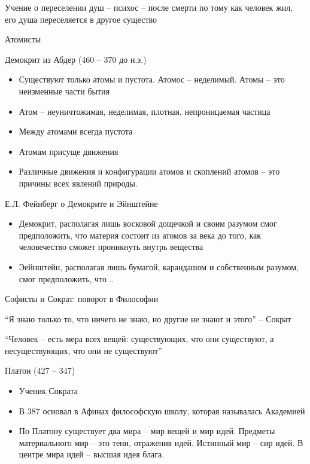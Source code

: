 \documentclass{book}
\theoremstyle{definition}
\begin{document}
    Учение о переселении душ -- психос -- после смерти по тому как человек жил, его душа переселяется в другое существо

    Атомисты

    Демокрит из Абдер (460 -- 370 до н.э.)
    \begin{itemize}
        \item  Существуют только атомы и пустота. Атомос -- неделимый. Атомы -- это неизменные части бытия
        \item Атом -- неуничтожимая, неделимая, плотная, непроницаемая частица
        \item Между атомами всегда пустота
        \item Атомам присуще движения
        \item Различные движения и конфигурации атомов и скоплений атомов -- это причины всех явлений природы.
    \end{itemize}

    Е.Л. Фейнберг о Демокрите и Эйнштейне
    \begin{itemize}
        \item  Демокрит, располагая лишь восковой дощечкой и своим разумом смог предположить, что материя состоит из атомов за века до того, как человечество сможет проникнуть внутрь вещества
        \item Эейнштейн, располагая лишь бумагой, карандашом и собственным разумом, смог предположить, что ..
    \end{itemize}

    Софисты и Сократ: поворот в Философии

    ``Я знаю только то, что ничего не знаю, но другие не знают и этого'' -- Сократ

    ``Человек -- есть мера всех вещей: существующих, что они существуют, а несуществующих, что они не существуют''

    Платон (427 -- 347)
    \begin{itemize}
        \item  Ученик Сократа
        \item В 387 основал в Афинах философскую школу, которая называлась Академией
        \item По Платону существует два мира -- мир вещей и мир идей. Предметы материального мир -- это тени, отражения идей. Истинный мир -- сир идей. В центре мира идей -- высшая идея блага.
    \end{itemize}
\end{document}
